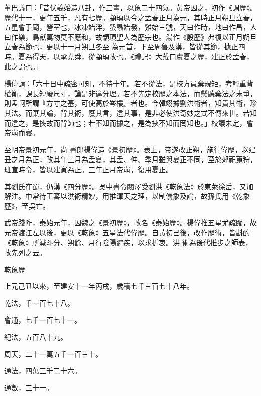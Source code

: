 \begin{pinyinscope}
 董巴議曰：「昔伏羲始造八卦，作三畫，以象二十四氣。黃帝因之，初作《調歷》。歷代十一，更年五千，凡有七歷。顓頊以今之孟春正月為元，其時正月朔旦立春，五星會于廟，營室也，冰凍始泮，蟄蟲始發，雞始三號，天曰作時，地曰作昌，人曰作樂，鳥獸萬物莫不應和，故顓頊聖人為歷宗也。湯作《殷歷》弗復以正月朔旦立春為節也，更以十一月朔旦冬至
 為元首，下至周魯及漢，皆從其節，據正四時。夏為得天，以承堯舜，從顓頊故也。《禮記》大戴曰虞夏之歷，建正於孟春，此之謂也。」



 楊偉請：「六十日中疏密可知，不待十年。若不從法，是校方員棄規矩，考輕重背權衡，課長短廢尺寸，論是非違分理。若不先定校歷之本法，而懸聽棄法之末爭，則孟軻所謂『方寸之基，可使高於岑樓』者也。今韓翊據劉洪術者，知貴其術，珍其法。而棄其論，背其術，廢其言，違其事，是非必使洪奇妙之式不傳來世。若知而違之，是挾故而背師也；若不知而據之，是為挾不知而罔知也。」校議未定，會帝崩而寢。



 至明帝景初元年，尚
 書郎楊偉造《景初歷》。表上，帝遂改正朔，施行偉歷，以建丑之月為正，改其年三月為孟夏，其孟、仲、季月雖與夏正不同，至於郊祀蒐狩，班宣時令，皆以建寅為正。三年正月帝崩，復用夏正。



 其劉氏在蜀，仍漢《四分歷》。吳中書令闞澤受劉洪《乾象法》於東萊徐岳，又加解注。中常待王蕃以洪術精妙，用推渾天之理，以制儀象及論，故孫氏用《乾象歷》，至吳亡。



 武帝踐阼，泰始元年，因魏之《景初歷》，改名《泰始歷》。楊偉推五星尤疏闊，故元帝渡江左以後，更以《乾象》五星法代偉歷。自黃初已後，改作歷術，皆斟酌《乾象》所減斗分、朔餘、月行陰陽遲疾，以求折衷。洪
 術為後代推步之師表，故先列之云。



 乾象歷



 上元己丑以來，至建安十一年丙戌，歲積七千三百七十八年。



 乾法，千一百七十八。



 會通，七千一百七十一。



 紀法，五百八十九。



 周天，二十一萬五千一百三十。



 通法，四萬三千二十六。



 通數，三十一。




\end{pinyinscope}
